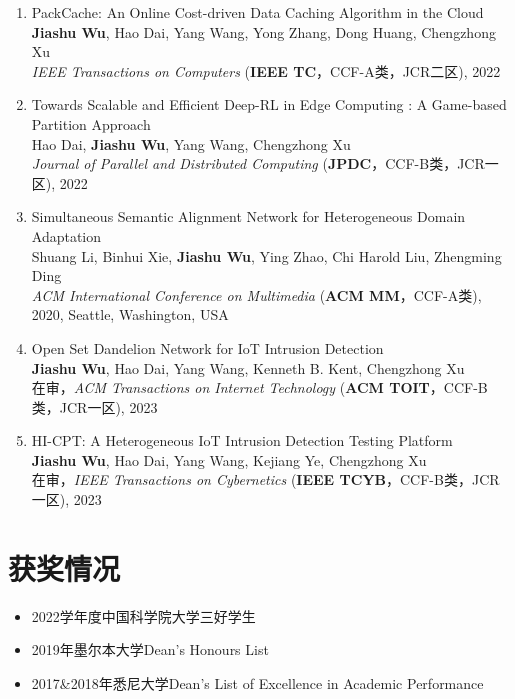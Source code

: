 \documentclass[letterpaper,11pt]{article}
\begin{document}
\begin{enumerate}
  \item PackCache: An Online Cost-driven Data Caching Algorithm in the Cloud\\
  \textbf{Jiashu Wu}, Hao Dai, Yang Wang\textsuperscript{\Letter}, Yong Zhang, Dong Huang, Chengzhong Xu\\
  \textit{IEEE Transactions on Computers} (\textbf{IEEE TC}，CCF-A类，JCR二区), 2022

  \item Towards Scalable and Efficient Deep-RL in Edge Computing : A Game-based Partition Approach\\
  Hao Dai, \textbf{Jiashu Wu}, Yang Wang\textsuperscript{\Letter}, Chengzhong Xu\\
  \textit{Journal of Parallel and Distributed Computing} (\textbf{JPDC}，CCF-B类，JCR一区), 2022

  \item Simultaneous Semantic Alignment Network for Heterogeneous Domain Adaptation\\
  Shuang Li, Binhui Xie, \textbf{Jiashu Wu}, Ying Zhao, Chi Harold Liu\textsuperscript{\Letter}, Zhengming Ding\\
  \textit{ACM International Conference on Multimedia} (\textbf{ACM MM}，CCF-A类), 2020, Seattle, Washington, USA

  \item Open Set Dandelion Network for IoT Intrusion Detection\\
  \textbf{Jiashu Wu}, Hao Dai, Yang Wang\textsuperscript{\Letter}, Kenneth B. Kent, Chengzhong Xu\\
  在审，\textit{ACM Transactions on Internet Technology} (\textbf{ACM TOIT}，CCF-B类，JCR一区), 2023

  \item HI-CPT: A Heterogeneous IoT Intrusion Detection Testing Platform\\
  \textbf{Jiashu Wu}, Hao Dai, Yang Wang\textsuperscript{\Letter}, Kejiang Ye, Chengzhong Xu\\
  在审，\textit{IEEE Transactions on Cybernetics} (\textbf{IEEE TCYB}，CCF-B类，JCR一区), 2023
\end{enumerate}


\vspace{1pt}

\section{获奖情况}
\begin{itemize}
  \item 2022学年度中国科学院大学三好学生
  \item 2019年墨尔本大学Dean's Honours List
  \item 2017\&2018年悉尼大学Dean's List of Excellence in Academic Performance
\end{itemize}
\end{document}
